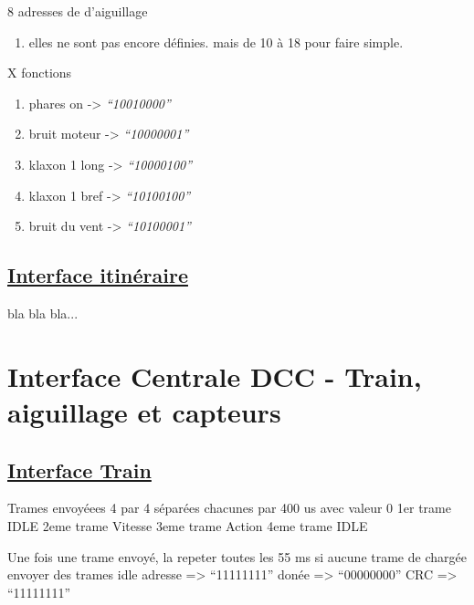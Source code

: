 \bigskip

8 adresses de d'aiguillage
\begin {enumerate}
\item elles ne sont pas encore définies. mais de 10 à 18 pour faire simple.
\end {enumerate}  

\bigskip

X fonctions
\begin {enumerate}
\item phares on     -> \emph{``10010000''}
\item bruit moteur  -> \emph{``10000001''}
\item klaxon 1 long -> \emph{``10000100''}
\item klaxon 1 bref -> \emph{``10100100''}
\item bruit du vent -> \emph{``10100001''}
\end {enumerate}  

\bigskip

\subsection{\underline{Interface itinéraire}}
\label{sec:ihm_iti}

bla bla bla...

\newpage

\section{Interface Centrale DCC - Train, aiguillage et capteurs}
\label{sec:int_dcc}

\subsection{\underline{Interface Train}}
\label{sec:int_train}

\bigskip
Trames envoyéees 4 par 4 séparées chacunes par 400 us avec valeur 0\linebreak
1er  trame IDLE\linebreak
2eme trame Vitesse\linebreak
3eme trame Action\linebreak
4eme trame IDLE\linebreak
\medskip

Une fois une trame envoyé, la repeter toutes les 55 ms\linebreak
si aucune trame de chargée envoyer des trames idle\linebreak
adresse => ``11111111''\linebreak
donée   => ``00000000''\linebreak
CRC     => ``11111111''\linebreak
\medskip


